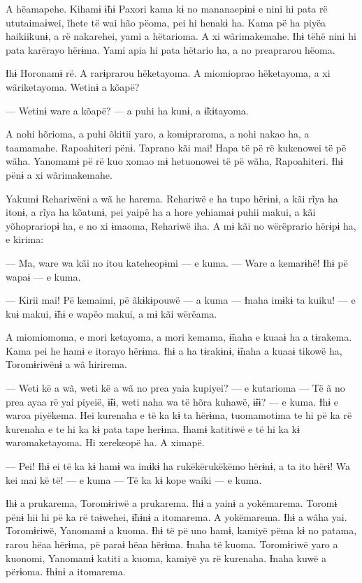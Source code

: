 A hëamapehe. Kihamɨ ɨ̃hɨ Paxori kama kɨ no mananaepɨnɨ e nini hi pata rë
ututaimaɨwei, ĩhete të wai hão pëoma, pei hi henakɨ ha. Kama pë ha piyëa
haikiikunɨ, a rë nakarehei, yami a hëtarioma. A xi wãrimakemahe. Ɨhɨ
tëhë nini hi pata karërayo hërɨma. Yami apia hi pata hëtario ha, a no
preaprarou hëoma. 

Ɨhɨ Horonamɨ rë. A rarɨprarou hëketayoma. A miomioprao hëketayoma, a xi
wãriketayoma. Wetinɨ a kõapë? 

--- Wetinɨ ware a kõapë? --- a puhi ha kunɨ, a ɨ̃kɨtayoma. 

A nohi hõrioma, a puhi õkitii yaro, a komɨpraroma, a nohi nakao ha, a
taamamahe. Rapoahiteri pënɨ. Taprano kãi mai! Hapa të pë rë kukenowei të
pë wãha. Yanomamɨ pë rë kuo xomao mɨ hetuonowei të pë wãha, Rapoahiteri.
Ɨhɨ pënɨ a xi wãrimakemahe. 

Yakumɨ Rehariwënɨ a wã he harema. Rehariwë e ha tupo hërɨnɨ, a kãi rĩya
ha itonɨ, a rĩya ha kõatunɨ, pei yaipë ha a hore yehiamaɨ puhii makui, a
kãi yõhoprariopɨ ha, e no xi ɨmaoma, Rehariwë iha. A mɨ kãi no
wërëprario hërɨpɨ ha, e kirima:

--- Ma, ware wa kãi no itou kateheopɨmi --- e kuma. --- Ware a kemarɨhë!
Ɨhɨ pë wapaɨ --- e kuma. 

--- Kirii mai! Pë kemaimi, pë ãkɨkɨpouwë --- a kuma --- Ɨnaha imɨkɨ ta
kuiku! --- e kuɨ makui, ɨ̃hɨ e wapëo makui, a mɨ kãi wërëama. 

A miomiomoma, e mori ketayoma, a mori kemama, ɨ̃naha e kuaaɨ ha a
tɨrakema. Kama pei he hamɨ e itorayo hërɨma. Ɨhɨ a ha tɨrakɨnɨ, ɨ̃naha a
kuaaɨ tikowë ha, Toromɨriwënɨ a wã hirirema. 

--- Weti kë a wã, weti kë a wã no prea yaia kupiyei? --- e kutarioma --- Të
ã no prea ayaa rë yai piyeië, ɨ̃ɨɨ, weti naha wa të hõra kuhawë, ɨ̃ɨɨ? ---
e kuma. Ɨhɨ e waroa piyëkema. Hei kurenaha e të ka kɨ ta hërɨma,
tuomamotima te hi pë ka rë kurenaha e te hi ka kɨ pata tape herɨma.
Ɨhamɨ katitiwë e të hi ka kɨ waromaketayoma. Hi xerekeopë ha. A ximapë. 

--- Pei! Ɨhɨ ei të ka kɨ hamɨ wa imɨkɨ ha rukëkërukëkëmo hërɨnɨ, a ta ito
hërɨ! Wa kei mai kë të! --- e kuma --- Të ka kɨ kope waiki --- e kuma. 

Ɨhɨ a prukarema, Toromɨriwë a prukarema. Ɨhɨ a yainɨ a yokëmarema.
Toromɨ pënɨ hii hi pë ka rë taɨwehei, ɨ̃hɨnɨ a itomarema. A yokëmarema.
Ɨhɨ a wãha yai. Toromɨriwë, Yanomamɨ a kuoma. Ɨhɨ të pë uno hamɨ, kamiyë
pëma kɨ no patama, rarou hëaa hërɨma, pë paraɨ hëaa hërɨma. Ɨnaha të
kuoma. Toromɨriwë yaro a kuonomi, Yanomamɨ katiti a kuoma, kamiyë ya rë
kurenaha. Ɨnaha kuwë a përɨoma. Ɨhɨnɨ a itomarema.

